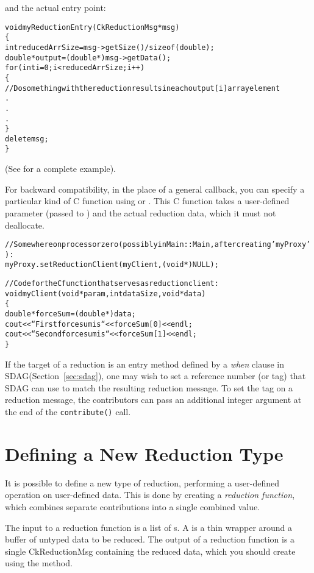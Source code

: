 and the actual entry point:

\begin{alltt}
void myReductionEntry(CkReductionMsg *msg)
\{
  int reducedArrSize=msg->getSize() / sizeof(double);
  double *output=(double *) msg->getData();
  for(int i=0 ; i<reducedArrSize ; i++)
  \{
   // Do something with the reduction results in each output[i] array element
   .
   .
   .
  \}
  delete msg;
\}
\end{alltt}

(See  for a complete example).

For backward compatibility, in the place of a general callback, you can
specify a particular kind of C function using 
or .  This C function takes a user-defined
parameter (passed to ) and the actual reduction data,
which it must not deallocate.

\begin{alltt}
  // Somewhere on processor zero (possibly in Main::Main, after creating 'myProxy'):
  myProxy.setReductionClient(myClient,(void *)NULL);

  // Code for the C function that serves as reduction client:
  void myClient(void *param,int dataSize,void *data)
  \{
    double *forceSum=(double *)data;
    cout<<``First force sum is ``<<forceSum[0]<<endl;
    cout<<``Second force sum is ``<<forceSum[1]<<endl;
  \}
\end{alltt}

If the target of a reduction is an entry method defined by a
\emph{when} clause in SDAG(Section~\ref{sec:sdag}), one may wish to set a
reference number (or tag) that SDAG can use to match the resulting
reduction message. To set the tag on a reduction message, the
contributors can pass an additional integer argument at the end of the
{\tt contribute()} call.

\section{Defining a New Reduction Type}

\label{new_type_reduction}

It is possible to define a new type of reduction, performing a 
user-defined operation on user-defined data.  This is done by 
creating a {\em reduction function}, which 
combines separate contributions 
into a single combined value.

The input to a reduction function is a list of s.
A  is a thin wrapper around a buffer of untyped data
to be reduced.  
The output of a reduction function is a single CkReductionMsg
containing the reduced data, which you should create using the
 method.  

